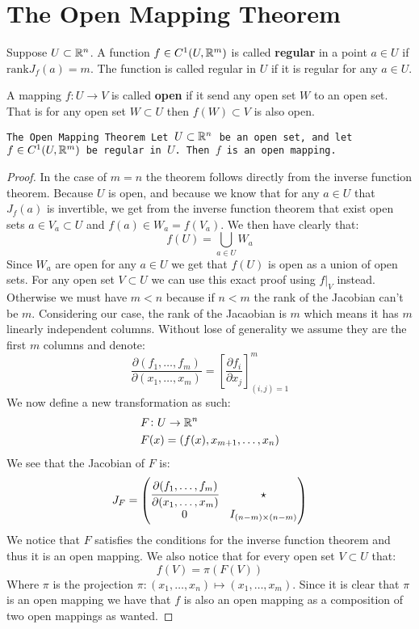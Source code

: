 \documentclass[11pt,a4paper]{article}
\begin{document}
	\section{The Open Mapping Theorem}
	\begin{definition}
		Suppose $U \subset \mathbb{R}^n$. A function $f \in C^1(U, \mathbb{R}^m)$ is called 
		\textbf{regular} in a point $a \in U$ if $\mathrm{rank}J_f(a) = m$.
		The function is called regular in $U$ if it is regular for any
		$a \in U$.
	\end{definition}
	\begin{definition}
		A mapping $f \colon U \to V$ is called \textbf{open} if it send
		any open set $W$ to an open set. That is for any open set 
		$W \subset U$ then $f(W) \subset V$ is also open.
	\end{definition}
	\begin{theorem}
		\tt{The Open Mapping Theorem}
		Let $U \subset \mathbb{R}^n$ be an open set, and let $f \in C^1(U,\mathbb{R}^m)$ be 
		regular in $U$. Then $f$ is an open mapping.
	\end{theorem}
	\begin{proof}
		In the case of $m = n$ the theorem follows directly from the inverse
		function theorem. Because $U$ is open, and because we know that
		for any $a \in U$ that $J_f(a)$ is invertible, we get from the
		inverse function theorem that exist open sets $a \in V_a \subset U$ 
		and $f(a) \in W_a = f(V_a)$. We then have clearly that:
		\[
			f(U) = \bigcup_{a \in U} W_a
		\]
		Since $W_a$ are open for any $a \in U$ we get that $f(U)$ is open
		as a union of open sets. For any open set $V \subset U$ we can
		use this exact proof using $f\vert_V$ instead. \\
		Otherwise we must have $m < n$ because if $n < m$ the rank of the
		Jacobian can't be $m$. Considering our case, the rank of the Jacaobian
		is $m$ which means it has $m$ linearly independent columns. Without
		lose of generality we assume they are the first $m$ columns and 
		denote:
		\[
			\frac{\partial(f_1,\dots,f_m)}{\partial(x_1,\dots,x_m)} = 
			\left[\frac{\partial f_i}{\partial x_j}\right]_{(i,j)=1}^{m}
		\]
		We now define a new transformation as such:
		\begin{align*}
			&F \colon U \to \mathbb{R}^n \\
			&F(x) = (f(x),x_{m+1},\dots,x_{n})
		\end{align*}
		We see that the Jacobian of $F$ is:
		\[
			J_F = \begin{pmatrix}
	\cfrac{\partial(f_1,\dots,f_m)}{\partial(x_1,\dots,x_m)} & \star \\
	0 & I_{(n-m) \times (n-m)}\\
				\end{pmatrix}
		\]
		We notice that $F$ satisfies the conditions for the inverse function
		theorem and thus it is an open mapping. We also notice that for
		every open set $V \subset U$ that:
		\[
			f(V) = \pi(F(V))
		\]
		Where $\pi$ is the projection 
		$\pi \colon (x_1,\dots,x_n) \mapsto (x_1,\dots,x_m)$. Since
		it is clear that $\pi$ is an open mapping we have that $f$
		is also an open mapping as a composition of two open mappings as
		wanted.
	\end{proof}
	
\end{document}
